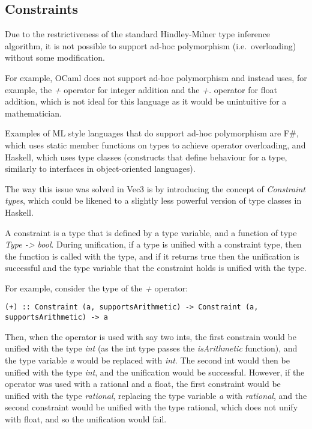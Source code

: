 \subsection{Constraints}\label{subsec:constraints}

Due to the restrictiveness of the standard Hindley-Milner type inference algorithm, it is not possible to support ad-hoc
polymorphism (i.e.\ overloading) without some modification.

For example, OCaml\citep{ocamlDocs} does not support ad-hoc polymorphism and instead uses, for example, the \textit{+}
operator for integer addition and the \textit{+.} operator for float addition, which is not ideal for this language 
as it would be unintuitive for a mathematician.

Examples of ML style languages that do support ad-hoc polymorphism are F\#, which uses static member functions on 
types to achieve operator overloading\citep{fsharpdocs}, and Haskell, which uses type classes\citep{haskellDocs} (constructs that define behaviour for a type, similarly to interfaces in object-oriented languages).

The way this issue was solved in Vec3 is by introducing the concept of \textit{Constraint types}, which could be 
likened to a slightly less powerful version of type classes in Haskell.

A constraint is a type that is defined by a type variable, and a function of type \textit{Type -> bool}.
During unification, if a type is unified with a constraint type, then the function is called with the type, and if it
returns true then the unification is successful and the type variable that the constraint holds is unified with the
type.

For example, consider the type of the \textit{+} operator:

\begin{verbatim}
(+) :: Constraint (a, supportsArithmetic) -> Constraint (a, supportsArithmetic) -> a
\end{verbatim}

Then, when the operator is used with say two ints, the first constrain would be unified with the type 
\textit{int} (as the int type passes the \textit{isArithmetic} function), and the type variable \textit{a} would be 
replaced with \textit{int}.
The second int would then be unified with the type \textit{int}, and the unification would be successful.
However, if the operator was used with a rational and a float, the first constraint would be unified with the type
\textit{rational}, replacing the type variable \textit{a} with \textit{rational}, and the second constraint would be 
unified 
with the type rational, which does not unify with float, and so the unification would fail.

